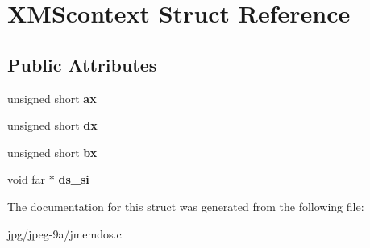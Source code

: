 \hypertarget{struct_x_m_scontext}{\section{X\+M\+Scontext Struct Reference}
\label{struct_x_m_scontext}
}
\subsection*{Public Attributes}
\begin{DoxyCompactItemize}
\item 
\hypertarget{struct_x_m_scontext_a5604354ae35cb3ce4764ccff173d0af2}{unsigned short {\bfseries ax}}\label{struct_x_m_scontext_a5604354ae35cb3ce4764ccff173d0af2}

\item 
\hypertarget{struct_x_m_scontext_aa1c23f775fc18b65041299b064e43e0b}{unsigned short {\bfseries dx}}\label{struct_x_m_scontext_aa1c23f775fc18b65041299b064e43e0b}

\item 
\hypertarget{struct_x_m_scontext_a25a611357ba455485f4d5db3a3c0a772}{unsigned short {\bfseries bx}}\label{struct_x_m_scontext_a25a611357ba455485f4d5db3a3c0a772}

\item 
\hypertarget{struct_x_m_scontext_ae16003451dbbc0c4dca43c895152441c}{void far $\ast$ {\bfseries ds\+\_\+si}}\label{struct_x_m_scontext_ae16003451dbbc0c4dca43c895152441c}

\end{DoxyCompactItemize}


The documentation for this struct was generated from the following file\+:\begin{DoxyCompactItemize}
\item 
jpg/jpeg-\/9a/jmemdos.\+c\end{DoxyCompactItemize}
